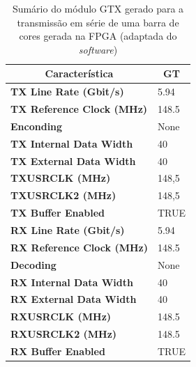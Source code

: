 \documentclass[11pt,a4paper]{article}
\begin{document}
	\begin{table}[h!]
		\centering
		\caption[Sumário do módulo GTX gerado para a transmissão em série de uma barra de cores gerada na FPGA]{Sumário do módulo GTX gerado para a transmissão em série de uma barra de cores gerada na FPGA (adaptada do \textit{software})}
		\label{table:sumario_planoD}
		\begin{tabular}{@{}ll@{}}
			\toprule
			\multicolumn{1}{c}{\textbf{Característica}} & \multicolumn{1}{c}{\textbf{GT}} \\ \midrule
			\textbf{TX Line Rate (Gbit/s)}                & \num{5,94}                            \\
			\textbf{TX Reference Clock (MHz)}           & \num{148.5}                         \\
			\textbf{Enconding}                          & None                            \\
			\textbf{TX Internal Data Width}             & 40                              \\
			\textbf{TX External Data Width}             & 40                              \\
			\textbf{TXUSRCLK (MHz)}                     & 148,5                           \\
			\textbf{TXUSRCLK2 (MHz)}                    & 148,5                           \\
			\textbf{TX Buffer Enabled}                  & TRUE                            \\
			\textbf{RX Line Rate (Gbit/s)}                & \num{5,94}                            \\
			\textbf{RX Reference Clock (MHz)}           & \num{148.5}                           \\
			\textbf{Decoding}                           & None                            \\
			\textbf{RX Internal Data Width}             & 40                              \\
			\textbf{RX External Data Width}             & 40                              \\
			\textbf{RXUSRCLK (MHz)}                     & \num{148.5}                           \\
			\textbf{RXUSRCLK2 (MHz)}                    & \num{148.5}                           \\
			\textbf{RX Buffer Enabled}                  & TRUE                            \\ \bottomrule
		\end{tabular}
	\end{table}
	
\end{document}
